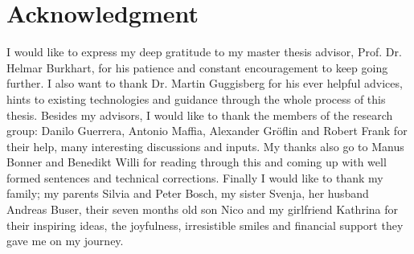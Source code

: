 \chapter*{Acknowledgment}
I would like to express my deep gratitude to my master thesis advisor, Prof. Dr. Helmar Burkhart, for his patience and constant encouragement to keep going further.
I also want to thank Dr. Martin Guggisberg for his ever helpful advices, hints to existing technologies and guidance through the whole process of this thesis.
Besides my advisors, I would like to thank the members of the research group: Danilo Guerrera,
Antonio Maffia, Alexander Gr\"oflin and Robert Frank for their help, many interesting discussions and inputs.
My thanks also go to Manus Bonner and Benedikt Willi for reading through this and coming up with well formed sentences and technical corrections.
Finally I would like to thank my family; my parents Silvia and Peter Bosch, my sister Svenja, her husband Andreas Buser, their seven months old son Nico and my girlfriend Kathrina for their inspiring ideas, the joyfulness, irresistible smiles and financial support they gave me on my journey.